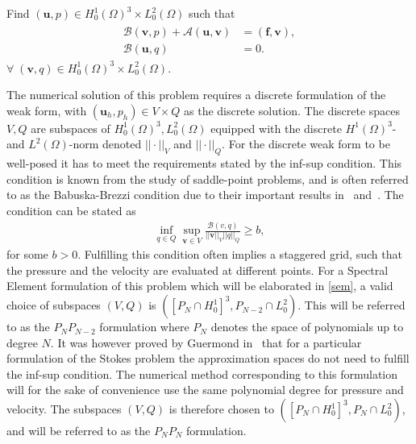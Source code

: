 Find $(\mathbf{u}, p) \in H^1_0(\Omega)^3\times L^2_0(\Omega)$ such that 
\begin{align}
    \begin{split}
           \mathcal{B}(\mathbf{v},p) 
         +\mathcal{A}(\mathbf{u},\mathbf{v}) &= (\mathbf{f},\mathbf{v}), \\
        \mathcal{B}(\mathbf{u},q) &= 0.
    \end{split}
	\label{eq:NSweak}
\end{align}
$\forall\; (\mathbf{v}, q) \in H_0^1(\Omega)^3\times L_0^2(\Omega)$.
%

The numerical solution of this problem requires a discrete formulation of the weak form, with $(\mathbf{u}_h,p_h)\in V\times Q$
as the discrete solution. The discrete spaces $V,Q$ are subspaces of $ H_0^1(\Omega)^{3},L^2_0(\Omega)$ equipped with the discrete
$ H^1(\Omega) ^3$- and $L^2(\Omega)$-norm denoted $||\cdot||_V$ and $||\cdot||_Q$. 
For the discrete weak form to be well-posed it has to meet the requirements stated by the
inf-sup condition. This condition is known from the study of saddle-point problems, and 
is often referred to as the Babuska-Brezzi condition due to their important results
in~\cite{Babuska} and~\cite{Brezzi}. The condition can be stated as
%
\begin{align}
    \inf_{q\in Q}\sup_{\mathbf{v}\in V}\frac{\mathcal{B}(v,q)}{||\mathbf{v}||_V||q||_Q} \ge b,
    \label{eq:infsup}
\end{align}
%
for some $b>0$. Fulfilling this condition often implies
a staggered grid, such that the pressure and the velocity are evaluated at different points. 
For a Spectral Element formulation of this problem which will be elaborated in \cref{sem},
a valid choice of subspaces $(V,Q)$ is $\left(  \left[  P_N\cap H^1_0\right]^3,P_{N-2} \cap L^{2}_{0}\right)$. This will be referred to as the 
$P_NP_{N-2}$ formulation where $P_N$ denotes the space of polynomials up to degree $N$.
It was however proved by Guermond in~\cite{GuermondPnPn} that for a particular formulation of the Stokes problem
the approximation spaces do not need to fulfill the inf-sup condition.
The numerical method corresponding to this formulation will for the sake of convenience use the same 
polynomial degree for pressure and velocity. The subspaces $(V,Q)$ is therefore chosen to 
$(\left[ P_N\cap H^1_0 \right]^3,P_{N} \cap L^{2}_{0})$,
and will be referred to as the $P_NP_N$ formulation.

